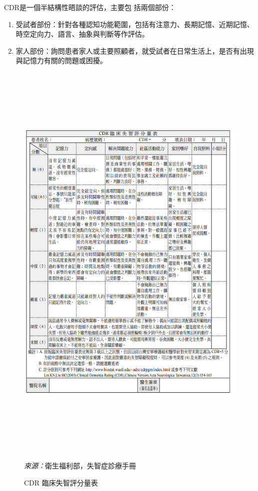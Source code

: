 CDR是一個半結構性晤談的評估，主要包
括兩個部份：
\begin{enumerate}
	\item
受試者部份：針對各種認知功能範圍，包括有注意力、長期記憶、近期記憶、時空定向力、語言、抽象與判斷等作評估。
\item
家人部份：詢問患者家人或主要照顧者，就受試者在日常生活上，是否有出現與記憶力有關的問題或困擾。
\end{enumerate}

\begin{figure}[H]
	\centering
	\centerline{\includegraphics[height=20cm]{pic/CDR.PNG}}
	\caption{CDR 臨床失智評分量表}
	\begin{minipage}{.7\linewidth}

		\footnotesize
		\emph{來源：}衛生福利部，失智症診療手冊

	\end{minipage}
	\label{fig:CDR}
\end{figure}

